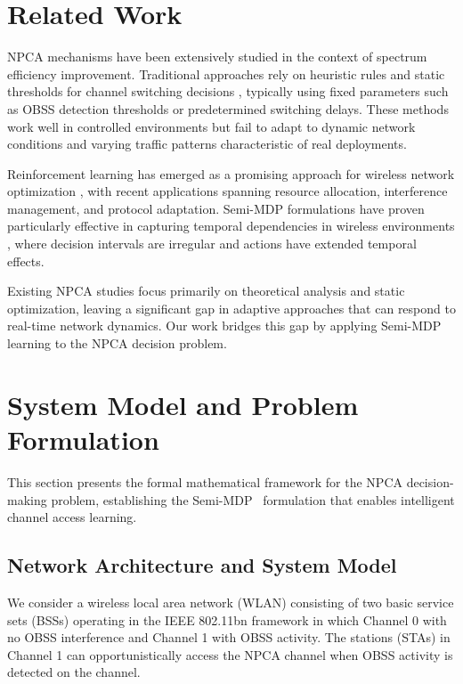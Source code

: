 \documentclass[conference]{IEEEtran}
\begin{document}
\section{Related Work}

NPCA mechanisms have been extensively studied in the context of spectrum efficiency improvement. Traditional approaches rely on heuristic rules and static thresholds for channel switching decisions \cite{wei2024optimized}, typically using fixed parameters such as OBSS detection thresholds or predetermined switching delays. These methods work well in controlled environments but fail to adapt to dynamic network conditions and varying traffic patterns characteristic of real deployments.

Reinforcement learning has emerged as a promising approach for wireless network optimization \cite{mnih2013playing}, with recent applications spanning resource allocation, interference management, and protocol adaptation. Semi-MDP formulations have proven particularly effective in capturing temporal dependencies in wireless environments \cite{sutton2018reinforcement}, where decision intervals are irregular and actions have extended temporal effects.

Existing NPCA studies focus primarily on theoretical analysis and static optimization, leaving a significant gap in adaptive approaches that can respond to real-time network dynamics. Our work bridges this gap by applying Semi-MDP learning to the NPCA decision problem.

\section{System Model and Problem Formulation}

This section presents the formal mathematical framework for the NPCA decision-making problem, establishing the Semi-MDP~\cite{sutton1999between} formulation that enables intelligent channel access learning.

\subsection{Network Architecture and System Model}

We consider a wireless local area network (WLAN) consisting of two basic service sets (BSSs) operating in the IEEE 802.11bn framework in which Channel 0 with no OBSS interference and Channel 1 with OBSS activity. The stations (STAs) in Channel 1 can opportunistically access the NPCA channel when OBSS activity is detected on the channel.
\end{document}

